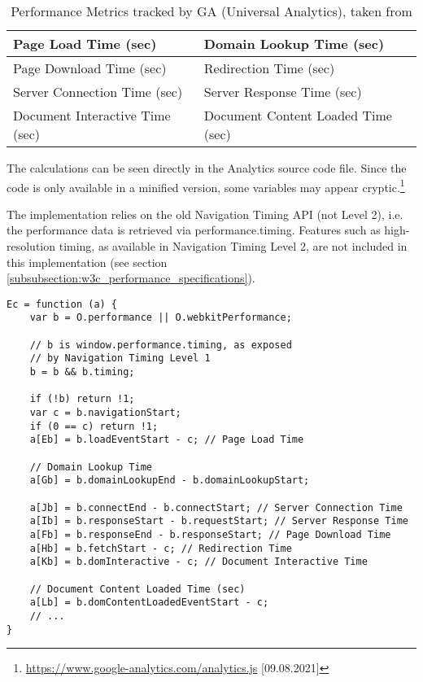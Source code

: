 \begin{table}[h]
	\small
	\centering
	\begin{tabular}{ | l | l |}
	\hline
	Page Load Time (sec) & Domain Lookup Time (sec) \\
	\hline
	Page Download Time (sec) & Redirection Time (sec) \\
	\hline
	Server Connection Time (sec) & Server Response Time (sec) \\
	\hline
	Document Interactive Time (sec) & Document Content Loaded Time (sec) \\
	\hline
	\end{tabular}
	\medskip
	\caption[Performance Metrics tracked by GA (Universal Analytics)]{Performance Metrics tracked by GA (Universal Analytics), taken from \cite{2021Google}}
	\label{table:ga_metrics}
\end{table}



The calculations can be seen directly in the Analytics source code file.
Since the code is only available in a minified version, some variables may appear cryptic.\footnote{\url{
https://www.google-analytics.com/analytics.js} [09.08.2021]}

The implementation relies on the old Navigation Timing API (not Level 2), i.e. the performance data is retrieved via performance.timing.
Features such as high-resolution timing, as available in Navigation Timing Level 2, are not included in this implementation (see section \ref{subsubsection:w3c_performance_specifications}).

\begin{center}
\begin{lstlisting}[caption={Performance Metrics Calculations in analytics.js}, label={listing:analyticsjs}, numbers=none]
Ec = function (a) {
	var b = O.performance || O.webkitPerformance;

	// b is window.performance.timing, as exposed
	// by Navigation Timing Level 1
	b = b && b.timing;

	if (!b) return !1;
	var c = b.navigationStart;
	if (0 == c) return !1;
	a[Eb] = b.loadEventStart - c; // Page Load Time
	
	// Domain Lookup Time
	a[Gb] = b.domainLookupEnd - b.domainLookupStart;
	
	a[Jb] = b.connectEnd - b.connectStart; // Server Connection Time
	a[Ib] = b.responseStart - b.requestStart; // Server Response Time
	a[Fb] = b.responseEnd - b.responseStart; // Page Download Time
	a[Hb] = b.fetchStart - c; // Redirection Time
	a[Kb] = b.domInteractive - c; // Document Interactive Time
	
	// Document Content Loaded Time (sec)
	a[Lb] = b.domContentLoadedEventStart - c;
	// ...
}
\end{lstlisting}
\end{center}



